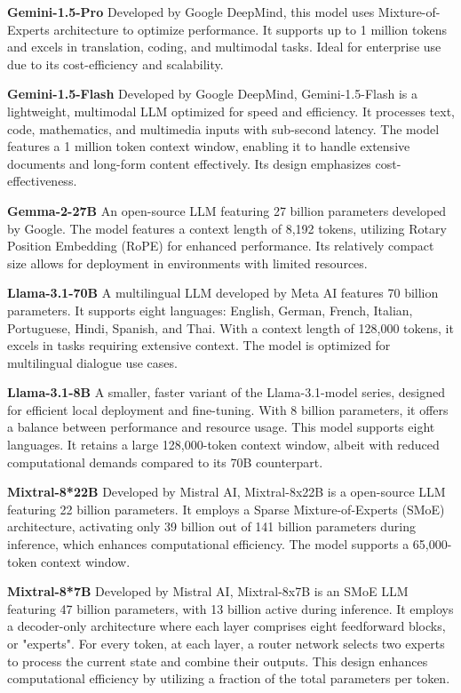 \textbf{Gemini-1.5-Pro} \cite{team2023gemini} Developed by Google DeepMind, this model uses Mixture-of-Experts architecture to optimize performance. It supports up to 1 million tokens and excels in translation, coding, and multimodal tasks. Ideal for enterprise use due to its cost-efficiency and scalability.

\textbf{Gemini-1.5-Flash} \cite{gemini15flash} Developed by Google DeepMind, Gemini-1.5-Flash is a lightweight, multimodal LLM optimized for speed and efficiency. It processes text, code, mathematics, and multimedia inputs with sub-second latency. The model features a 1 million token context window, enabling it to handle extensive documents and long-form content effectively. Its design emphasizes cost-effectiveness.

\textbf{Gemma-2-27B} \cite{gemma2_27b} An open-source LLM featuring 27 billion parameters developed by Google. The model features a context length of 8,192 tokens, utilizing Rotary Position Embedding (RoPE) for enhanced performance. Its relatively compact size allows for deployment in environments with limited resources.

\textbf{Llama-3.1-70B} \cite{meta2024llama31_70b} A multilingual LLM developed by Meta AI features 70 billion parameters. It supports eight languages: English, German, French, Italian, Portuguese, Hindi, Spanish, and Thai. With a context length of 128,000 tokens, it excels in tasks requiring extensive context. The model is optimized for multilingual dialogue use cases.

\textbf{Llama-3.1-8B} \cite{meta2024llama31_8b} A smaller, faster variant of the Llama-3.1-model series, designed for efficient local deployment and fine-tuning. With 8 billion parameters, it offers a balance between performance and resource usage. This model supports eight languages. It retains a large 128,000-token context window, albeit with reduced computational demands compared to its 70B counterpart.

\textbf{Mixtral-8*22B} \cite{mistral2024mixtral8x22b} Developed by Mistral AI, Mixtral-8x22B is a open-source LLM featuring 22 billion parameters. It employs a Sparse Mixture-of-Experts (SMoE) architecture, activating only 39 billion out of 141 billion parameters during inference, which enhances computational efficiency. The model supports a 65,000-token context window.

\textbf{Mixtral-8*7B} \cite{mistral2023mixtral8x7b} Developed by Mistral AI, Mixtral-8x7B is an SMoE LLM featuring 47 billion parameters, with 13 billion active during inference. It employs a decoder-only architecture where each layer comprises eight feedforward blocks, or "experts". For every token, at each layer, a router network selects two experts to process the current state and combine their outputs. This design enhances computational efficiency by utilizing a fraction of the total parameters per token.

